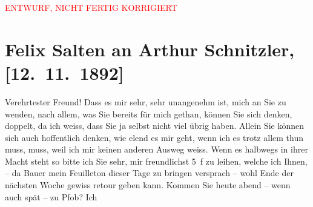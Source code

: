 
\begin{center}
            \textcolor{red}{ENTWURF, NICHT FERTIG KORRIGIERT}
                      \end{center}
            
         
         \renewcommand{\erwaehntePersonen}{Personen: Julius Bauer, Paul Horn}
         \renewcommand{\erwaehnteOrte}{Orte: Café Pfob, Café Union, Riedhof, Volkstheater, Wien}
         \renewcommand{\erwaehnteWerke}{Werke: ?? [Feuilleton], Musotte, Tagebuch}
               \section[Felix Salten an Arthur Schnitzler, {[}12. 11. 1892{]}]{ Felix Salten an Arthur Schnitzler, {[}12. 11. 1892{]}}\nopagebreak{}\rehead{ }\begin{ledgroupsized}[t]{13cm}\normalsize\beginnumbering \toendnotes[C]{\smallbreak\pagebreak[2]} 
\toendnotes[C]{\smallbreak}\pstart
           \noindent{}{\pb}Verehrtester Freund! Dass es mir sehr, sehr unangenehm ist, mich an
               Sie zu wenden, nach allem, was Sie bereits für mich gethan, können Sie sich denken,
               doppelt, da ich weiss, dass Sie ja selbst nicht viel übrig haben. Allein Sie können
               sich auch hoffentlich denken, wie elend es mir geht, wenn ich es trotz allem thun
               muss, muss, weil ich mir keinen anderen Ausweg weiss. Wenn es halbwegs in ihrer Macht steht so bitte ich Sie sehr, mir
               freundlichst 5 f zu leihen, welche ich {\pb}Ihnen, – da Bauer mein Feuilleton dieser Tage zu
               bringen versprach – wohl Ende der nächsten Woche \introOben{}gewiss\introOben{} retour geben kann. \pend
           \pstart
           Kommen Sie heute abend – wenn auch spät – zu Pfob? Ich

\end{ledgroupsized}
